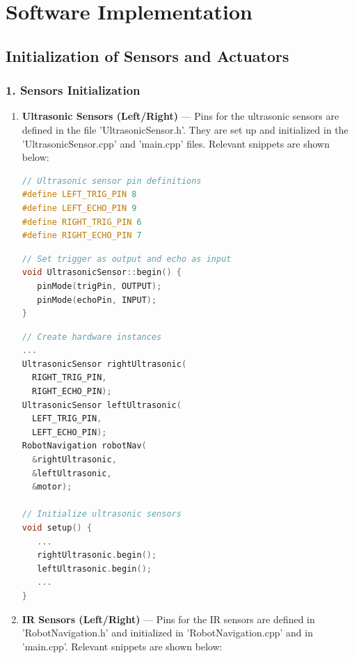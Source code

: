 \documentclass[conference]{IEEEtran}
\begin{document}
\section{Software Implementation}
\label{soft}

\subsection{Initialization of Sensors and Actuators}
\subsubsection*{\textbf{1. Sensors Initialization}}

\begin{enumerate}[label=\alph*)]

\item \textbf{Ultrasonic Sensors (Left/Right)} — Pins for the ultrasonic sensors are defined in the file 'UltrasonicSensor.h'. They are set up and initialized in the 'UltrasonicSensor.cpp' and 'main.cpp' files. Relevant snippets are shown below:

\begin{lstlisting}[language=C++, caption=Pin definitions in UltrasonicSensor.h]
// Ultrasonic sensor pin definitions
#define LEFT_TRIG_PIN 8
#define LEFT_ECHO_PIN 9
#define RIGHT_TRIG_PIN 6
#define RIGHT_ECHO_PIN 7
\end{lstlisting}

\begin{lstlisting}[language=C++, caption=Pin setup in UltrasonicSensor.cpp]
// Set trigger as output and echo as input
void UltrasonicSensor::begin() {
   pinMode(trigPin, OUTPUT);
   pinMode(echoPin, INPUT);
}
\end{lstlisting}

\begin{lstlisting}[language=C++, caption=Sensor initialization in main.cpp]
// Create hardware instances
...
UltrasonicSensor rightUltrasonic(
  RIGHT_TRIG_PIN,
  RIGHT_ECHO_PIN);
UltrasonicSensor leftUltrasonic(
  LEFT_TRIG_PIN,
  LEFT_ECHO_PIN);
RobotNavigation robotNav(
  &rightUltrasonic,
  &leftUltrasonic,
  &motor);
 
// Initialize ultrasonic sensors
void setup() {
   ...
   rightUltrasonic.begin();
   leftUltrasonic.begin();
   ...
}
\end{lstlisting}

\item \textbf{IR Sensors (Left/Right)} — Pins for the IR sensors are defined in 'RobotNavigation.h' and initialized in 'RobotNavigation.cpp' and in 'main.cpp'. Relevant snippets are shown below:


\end{enumerate}
\end{document}
